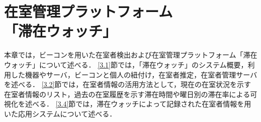 \chapter{在室管理プラットフォーム\\「滞在ウォッチ」}\label{3}
本章では，ビーコンを用いた在室者検出および在室管理プラットフォーム「滞在ウォッチ」について述べる．
\ref{3.1}節では，「滞在ウォッチ」のシステム概要，利用した機器やサーバ，ビーコンと個人の紐付け，在室者推定，在室者管理サーバを述べる．
\ref{3.2}節では，在室者情報の活用方法として，現在の在室状況を示す在室者情報のリスト，過去の在室履歴を示す滞在時間や曜日別の滞在率による可視化を述べる．
\ref{3.4}節では，滞在ウォッチによって記録された在室者情報を用いた応用システムについて述べる．




% 

